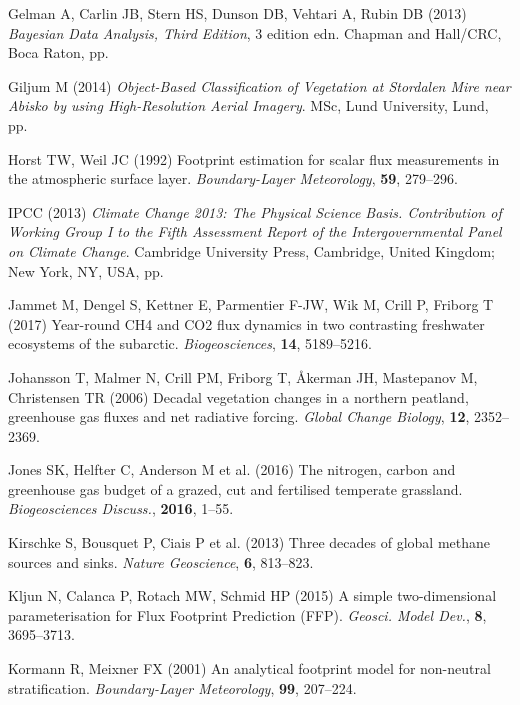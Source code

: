 \hypertarget{ref-Gelman2013}{}
Gelman A, Carlin JB, Stern HS, Dunson DB, Vehtari A, Rubin DB (2013)
\emph{\textup{Bayesian Data Analysis, Third Edition}}, 3 edition edn.
Chapman and Hall/CRC, Boca Raton, pp.

\hypertarget{ref-Giljum2014}{}
Giljum M (2014) \emph{\textup{Object-Based Classification of Vegetation
at Stordalen Mire near Abisko by using High-Resolution Aerial Imagery}}.
MSc, Lund University, Lund, pp.

\hypertarget{ref-Horst1992}{}
Horst TW, Weil JC (1992) Footprint estimation for scalar flux
measurements in the atmospheric surface layer. \emph{Boundary-Layer
Meteorology}, \textbf{59}, 279--296.

\hypertarget{ref-IPCC2013}{}
IPCC (2013) \emph{\textup{Climate Change 2013: The Physical Science
Basis. Contribution of Working Group I to the Fifth Assessment Report of
the Intergovernmental Panel on Climate Change}}. Cambridge University
Press, Cambridge, United Kingdom; New York, NY, USA, pp.

\hypertarget{ref-Jammet2017}{}
Jammet M, Dengel S, Kettner E, Parmentier F-JW, Wik M, Crill P, Friborg
T (2017) Year-round CH4 and CO2 flux dynamics in two contrasting
freshwater ecosystems of the subarctic. \emph{Biogeosciences},
\textbf{14}, 5189--5216.

\hypertarget{ref-Johansson2006}{}
Johansson T, Malmer N, Crill PM, Friborg T, Åkerman JH, Mastepanov M,
Christensen TR (2006) Decadal vegetation changes in a northern peatland,
greenhouse gas fluxes and net radiative forcing. \emph{Global Change
Biology}, \textbf{12}, 2352--2369.

\hypertarget{ref-Jones2016}{}
Jones SK, Helfter C, Anderson M et al. (2016) The nitrogen, carbon and
greenhouse gas budget of a grazed, cut and fertilised temperate
grassland. \emph{Biogeosciences Discuss.}, \textbf{2016}, 1--55.

\hypertarget{ref-Kirschke2013}{}
Kirschke S, Bousquet P, Ciais P et al. (2013) Three decades of global
methane sources and sinks. \emph{Nature Geoscience}, \textbf{6},
813--823.

\hypertarget{ref-Kljun2015}{}
Kljun N, Calanca P, Rotach MW, Schmid HP (2015) A simple two-dimensional
parameterisation for Flux Footprint Prediction (FFP). \emph{Geosci.
Model Dev.}, \textbf{8}, 3695--3713.

\hypertarget{ref-Kormann2001}{}
Kormann R, Meixner FX (2001) An analytical footprint model for
non-neutral stratification. \emph{Boundary-Layer Meteorology},
\textbf{99}, 207--224.

